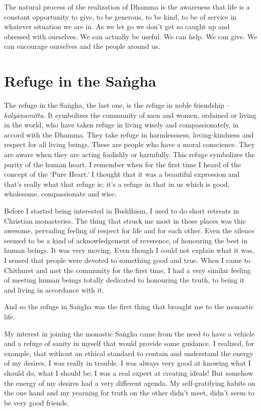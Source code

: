 The natural process of the realization of Dhamma is the awareness that life is a constant opportunity to give, to be generous, to be kind, to be of service in whatever situation we are in. As we let go we don't get so caught up and obsessed with ourselves. We can actually be useful. We can help. We can give. We can encourage ourselves and the people around us.

\section*{Refuge in the Sa\.ngha}

The refuge in the Sa\.ngha, the last one, is the refuge in noble friendship -- \textit{kaly\=a\d{n}amitta}. It symbolizes the community of men and women, ordained or living in the world, who have taken refuge in living wisely and compassionately, in accord with the Dhamma. They take refuge in harmlessness, loving-kindness and respect for all living beings. These are people who have a moral conscience. They are aware when they are acting foolishly or harmfully. This refuge symbolizes the purity of the human heart. I remember when for the first time I heard of the concept of the `Pure Heart.' I thought that it was a beautiful expression and that's really what that refuge is; it's a refuge in that in us which is good, wholesome, compassionate and wise.

Before I started being interested in Buddhism, I used to do short retreats in Christian monasteries.  The thing that struck me most in those places was this awesome, pervading feeling of respect for life and for each other. Even the silence seemed to be a kind of acknowledgement of reverence, of honouring the best in human beings. It was very moving. Even though I could not explain what it was, I sensed that people were devoted to something good and true. When I came to Chithurst and met the community for the first time, I had a very similar feeling of meeting human beings totally dedicated to honouring the truth, to being it and living in accordance with it.

And so the refuge in Sa\.ngha was the first thing that brought me to the monastic life.

My interest in joining the monastic Sa\.ngha came from the need to have a vehicle and a refuge of sanity in myself that would provide some guidance. I realized, for example, that without an ethical standard to contain and understand the energy of my desires, I was really in trouble. I was always very good at knowing what I should do, what I should be; I was a real expert at creating ideals! But somehow the energy of my desires had a very different agenda. My self-gratifying habits on the one hand and my yearning for truth on the other didn't meet, didn't seem to be very good friends.

